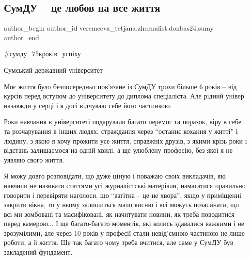  
 
 
 
 
 
\subsection{СумДУ – це любов на все життя}
\label{sec:23_05_2023.fb.veremeeva_tetjana.zhurnalist.donbas24.sumy.1.sumdu_ljubov_na_vse_zhyttja}
 
\ifcmt
 author_begin
   author_id veremeeva_tetjana.zhurnalist.donbas24.sumy
 author_end
\fi

\#сумду\_75кроків\_успіху

Сумський державний університет

Моє життя було безпосередньо пов'язане із СумДУ трохи більше 6 років – від
курсів перед вступом до університету до диплома спеціаліста. Але рідний універ
назавжди у серці і я досі відчуваю себе його частинкою.

Роки навчання в університеті подарували багато перемог та поразок, віру в себе
та розчарування в інших людях, страждання через \enquote{останнє кохання у житті} і
людину, з якою я хочу прожити усе життя, справжніх друзів, з якими крізь роки і
відстань залишаємося на одній хвилі, а ще улюблену професію, без якої я не
уявляю свого життя.

Я можу довго розповідати, що дуже ціную і поважаю своїх викладачів, які навчили
не називати статтями усі журналістські матеріали, намагатися правильно говорити
і перевіряти наголоси, що \enquote{вагітна – це не хвора}, якщо у приміщенні закрити
вікна, то у ньому залишиться мало кисню і всі можуть позасинати, що всі ми
зомбовані та масифіковані, як начитувати новини, як треба поводитися перед
камерою... І ще багато-багато моментів, які колись здавалися важкими і не
зрозумілими, але через 10 років у професії стали невід'ємною частиною не лише
роботи, а й життя. Ще так багато чому треба вчитися, але саме у СумДУ був
закладений фундамент.

